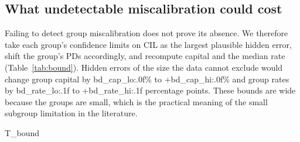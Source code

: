 \documentclass[11pt,a4paper]{article}
\newcommand{\tabsize}{\footnotesize}
\begin{document}
\subsection{What undetectable miscalibration could cost}
Failing to detect group miscalibration does not prove its absence. We therefore take each group's confidence limits on CIL as the largest plausible hidden error, shift the group's PDs accordingly, and recompute capital and the median rate (Table~\ref{tab:bound}). Hidden errors of the size the data cannot exclude would change group capital by {{bd_cap_lo:.0f}}\% to +{{bd_cap_hi:.0f}}\% and group rates by {{bd_rate_lo:.1f}} to +{{bd_rate_hi:.1f}} percentage points. These bounds are wide because the groups are small, which is the practical meaning of the small subgroup limitation in the literature.
\begin{table}[H]\centering\tabsize\caption{Range across groups of the capital and rate error if the group's PD were mis-stated by the limit of its 95\% interval for CIL.}\label{tab:bound}
{{T_bound}}\end{table}
\end{document}
